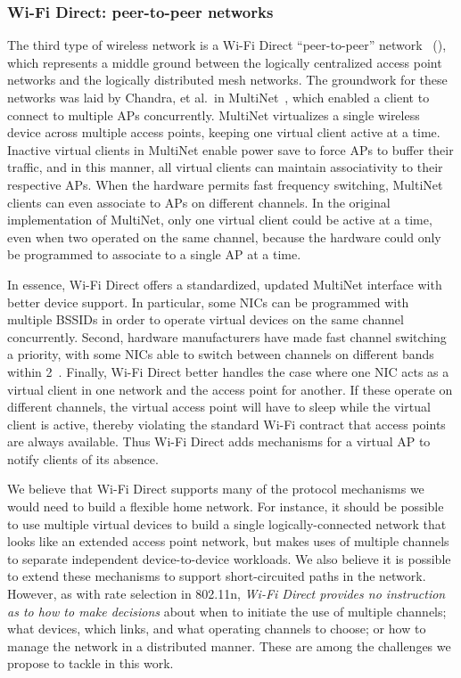 \subsubsection{Wi-Fi Direct: peer-to-peer networks}
The third type of wireless network is a Wi-Fi Direct ``peer-to-peer'' network~\cite{wifi_direct} (), which represents a middle ground between the logically centralized access point networks and the logically distributed mesh networks. The groundwork for these networks was laid by Chandra, et al.\ in MultiNet~\cite{chandra_multinet}, which enabled a client to connect to multiple APs concurrently. MultiNet virtualizes a single wireless device across multiple access points, keeping one virtual client active at a time. Inactive virtual clients in MultiNet enable power save to force APs to buffer their traffic, and in this manner, all virtual clients can maintain associativity to their respective APs. When the hardware permits fast frequency switching, MultiNet clients can even associate to APs on different channels. In the original implementation of MultiNet, only one virtual client could be active at a time, even when two operated on the same channel, because the hardware could only be programmed to associate to a single AP at a time.

In essence, Wi-Fi Direct offers a standardized, updated MultiNet interface with better device support. In particular, some NICs can be programmed with multiple BSSIDs in order to operate virtual devices on the same channel concurrently. Second, hardware manufacturers have made fast channel switching a priority, with some NICs able to switch between channels on different bands within 2\ms~\cite{atheros_ar9390}. Finally, Wi-Fi Direct better handles the case where one NIC acts as a virtual client in one network and the access point for another. If these operate on different channels, the virtual access point will have to sleep while the virtual client is active, thereby violating the standard Wi-Fi contract that access points are always available. Thus Wi-Fi Direct adds mechanisms for a virtual AP to notify clients of its absence.

 We believe that Wi-Fi Direct supports many of the protocol mechanisms we would need to build a flexible home network. For instance, it should be possible to use multiple virtual devices to build a single logically-connected network that looks like an extended access point network, but makes uses of multiple channels to separate independent device-to-device workloads. We also believe it is possible to extend these mechanisms to support short-circuited paths in the network. However, as with rate selection in 802.11n, \emph{Wi-Fi Direct provides no instruction as to how to make decisions} about when to initiate the use of multiple channels; what devices, which links, and what operating channels to choose; or how to manage the network in a distributed manner. These are among the challenges we propose to tackle in this work.

